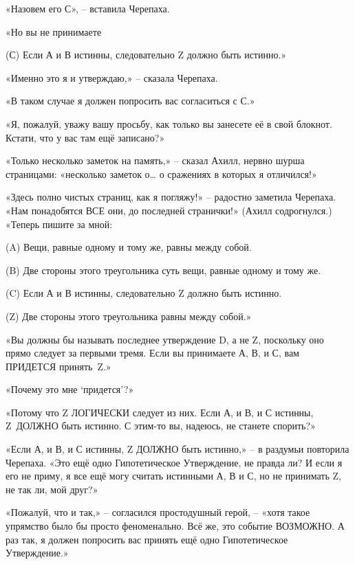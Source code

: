 \documentclass[../main.tex]{subfiles}
\begin{document}
\begin{Dialogue}
«Назовем его С», \--- вставила Черепаха.

«Но вы не принимаете

\begin{statements}
    \item[(С)] Если А и В истинны, следовательно Z должно быть истинно.»
\end{statements}

«Именно это я и утверждаю,» \--- сказала Черепаха.

«В таком случае я должен попросить вас согласиться с С.»

«Я, пожалуй, уважу вашу просьбу, как только вы занесете её в свой блокнот. Кстати, что у вас там ещё записано?»

«Только несколько заметок на память,» \--- сказал Ахилл, нервно шурша страницами: «несколько заметок о\ldots{} о сражениях в которых я отличился!»

«Здесь полно чистых страниц, как я погляжу!» \--- радостно заметила Черепаха. «Нам понадобятся ВСЕ они, до последней странички!» (Ахилл содрогнулся.) «Теперь пишите за мной:

\begin{statements}
    \item[(A)] Вещи, равные одному и тому же, равны между собой.
    \item[(B)] Две стороны этого треугольника суть вещи, равные одному и тому же.
    \item[(C)] Если А и В истинны, следовательно Z должно быть истинно.
    \item[(Z)] Две стороны этого треугольника равны между собой.»
\end{statements}

«Вы должны бы называть последнее утверждение D, а не Z, поскольку оно прямо следует за первыми тремя. Если вы принимаете А, В, и С, вам ПРИДЕТСЯ принять~Z.»

«Почему это мне \enquote*{придется}?»

«Потому что Z ЛОГИЧЕСКИ следует из них. Если А, и В, и С истинны, Z~ДОЛЖНО быть истинно. С этим-то вы, надеюсь, не станете спорить?»

«Если А, и В, и С истинны, Z ДОЛЖНО быть истинно,» \--- в раздумьи повторила Черепаха. «Это ещё одно Гипотетическое Утверждение, не правда ли? И если я его не приму, я все ещё могу считать истинными А, В и С, но не принимать Z, не так ли, мой друг?»

«Пожалуй, что и так,» \--- согласился простодушный герой, \--- «хотя такое упрямство было бы просто феноменально. Всё же, это событие ВОЗМОЖНО\@. А раз так, я должен попросить вас принять ещё одно Гипотетическое Утверждение.»


\end{Dialogue}
\end{document}
